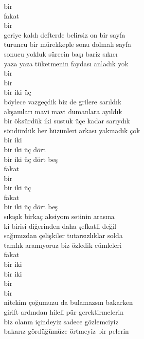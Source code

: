 \documentclass[10pt, openright, oneside]{memoir}
\theoremstyle{definition}
\begin{document}
\begin{cverse}
  bir \\
  fakat \\
  bir \\
  geriye kaldı defterde belirsiz on bir sayfa \\
  turuncu bir mürekkeple sonu dolmalı sayfa \\
  sonucu yokluk sürecin başı bariz sıkıcı \\
  yaza yaza tüketmenin faydası anladık yok \\
  bir \\
  bir \\
  bir iki üç \\
  böylece vazgeçdik biz de grilere sarıldık \\
  akşamları mavi mavi dumanlara ayıldık \\
  bir öksürdük iki sustuk üçe kadar sarıydık \\
  söndürdük her hüzünleri arkası yakmadık çok \\
  bir iki \\
  bir iki üç dört \\
  bir iki üç dört beş \\
  fakat \\
  bir \\
  bir iki üç \\
  fakat \\
  bir iki üç dört beş \\
  sıkışık birkaç aksiyom setinin arasına \\
  ki birisi diğerinden daha şefkatli değil \\
  sağımızdan çelişkiler tutarsızlıklar solda \\
  tamlık aramıyoruz biz özledik cümleleri \\
  fakat \\
  bir iki \\
  bir iki \\
  bir \\
  bir \\
  nitekim çoğumuzu da bulamazsın bakarken \\
  girift ardından hileli pür gerektirmelerin \\
  biz olanın içindeyiz sadece gözlemciyiz \\
  bakarız gördüğümüze örtmeyiz bir pelerin \\
\end{cverse}
\vspace*{\fill}
%
\newpage
{}
\vspace*{\fill}
\end{document}

